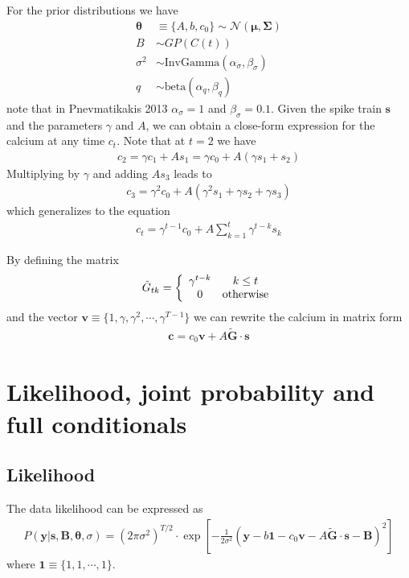 \documentclass{article}
\theoremstyle{remark}
\begin{document}
For the prior distributions we have
\begin{align}
    \bm{\theta}&\equiv\lbrace A,b,c_0\rbrace \sim \mathcal{N}(\bm{\mu},\bm{\Sigma})\\
    B &\sim GP(C(t))\\
    \sigma^2 &\sim \mathrm{InvGamma}(\alpha_\sigma,\beta_\sigma)\\
    q&\sim \mathrm{beta}(\alpha_q,\beta_q)
\end{align}
note that in Pnevmatikakis 2013 $\alpha_\sigma=1$ and $\beta_\sigma=0.1$.
Given the spike train $\bm{s}$ and the parameters $\gamma$ and $A$, we can obtain a close-form expression for the calcium at any time $c_t$. 
Note that at $t=2$ we have 
\begin{align}
    c_2=\gamma c_1 +As_1 = \gamma c_0 + A(\gamma s_1 + s_2)
\end{align}
Multiplying by $\gamma$ and adding $A s_3$ leads to
\begin{align}
    c_3=\gamma^2 c_0 + A(\gamma^2 s_1+\gamma s_2 +\gamma s_3)
\end{align}
which generalizes to the equation
\begin{align}
    c_t = \gamma^{t-1}c_0 + A\sum_{k=1}^{t} \gamma^{t-k}s_k
\end{align}

By defining the matrix
\begin{align}
    \tilde G_{tk} = \left\lbrace\begin{array}{c c}
        \gamma^{t-k} & k\le t\\
        0 & \mathrm{otherwise}
    \end{array}\right.
\end{align}
and the vector $\bm{v} \equiv \lbrace 1,\gamma,\gamma^2,\cdots,\gamma^{T-1}\rbrace$ 
we can rewrite the calcium in matrix form
\begin{align}
    \bm{c} = c_0 \bm{v} + A \bm{\tilde G}\cdot \bm{s}
\end{align}

\section{Likelihood, joint probability and full conditionals}
\subsection{Likelihood}
The data likelihood can be expressed as
\begin{align}
    P(\bm{y} | \bm{s},\bm{B}, \bm{\theta},\sigma) = (2\pi\sigma^2)^{T/2}\cdot \exp\left[-\frac{1}{2\sigma^2}(\bm{y}-b\bm{1} - c_0 \bm{v}-A\bm{\tilde G}\cdot \bm{s}-\bm{B})^2\right]
\end{align}
where $\bm{1}\equiv \lbrace 1,1,\cdots,1\rbrace$. 
\end{document}
